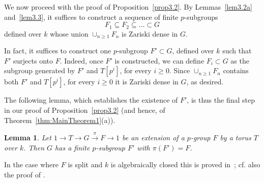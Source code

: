 \documentclass[11pt]{amsart}
\newtheorem{lem}[thm]{Lemma}
\theoremstyle{definition}
\theoremstyle{remark}
\begin{document}
We now proceed with the proof of Proposition~\ref{prop3.2}.
By Lemmas~\ref{lem3.2a} and~\ref{lem3.3}, it suffices to 
construct a sequence of finite $p$-subgroups
\[ F_1 \subseteq F_2 \subseteq \dots \subset G \]
defined over $k$ whose union $\cup_{n \ge 1} F_n$ is Zariski 
dense in $G$. 

In fact, it suffices to construct one $p$-subgroup 
$F' \subset G$, defined over $k$ such that $F'$
surjects onto $F$. Indeed, once $F'$ is constructed,
we can define $F_i \subset G$ as 
the subgroup generated  by $F'$ and $T[p^i]$, for every $i \ge 0$.
Since $\cup_{n \ge 1} F_n$ contains both $F'$ and 
$T[p^i]$, for every $i \ge 0$ it is Zariski dense 
in $G$, as desired.

The following lemma, which establishes the existence of $F'$, 
is thus the final step in our proof of Proposition~\ref{prop3.2}
(and hence, of Theorem~\ref{thm:MainTheorem1}(a)).

\begin{lem} \label{lem.schneider}
Let $1 \to T \to G \xrightarrow{\pi} F \to 1$ be an extension 
of a $p$-group $F$ by a torus $T$ over $k$. 
Then $G$ has a finite $p$-subgroup $F'$ with $\pi(F')= F$. 
\end{lem}

In the case where $F$ is split and $k$ is algebraically closed
this is proved in~\cite[p. 564]{cgr}; cf. also the proof of
\cite[Lemme 5.11]{bs}. 
\end{document}
